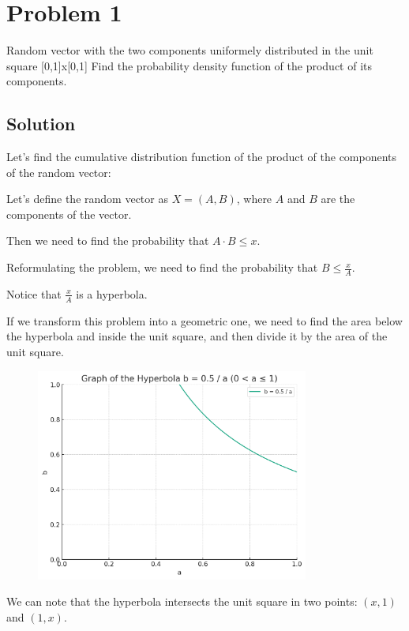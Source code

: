 \section*{Problem 1}

Random vector with the two components uniformely distributed in the unit square [0,1]x[0,1]
Find the probability density function of the product of its components.

\subsection*{Solution}

Let's find the cumulative distribution function of the product of the components of
the random vector:

Let's define the random vector as $X = (A, B)$, where $A$ and $B$ are the components
of the vector.

Then we need to find the probability that $A \cdot B \leq x$.

Reformulating the problem, we need to find the probability that $B \leq \frac{x}{A}$.

Notice that $\frac{x}{A}$ is a hyperbola.

If we transform this problem into a geometric one, we need to find the area below
the hyperbola and inside the unit square, and then divide it by the area of the unit square.

\begin{figure}[h]
    \includegraphics[width=0.8\textwidth]{images/p.jpg}
    \centering
\end{figure}

We can note that the hyperbola intersects the unit square in two points: $(x, 1)$
and $(1, x)$.

